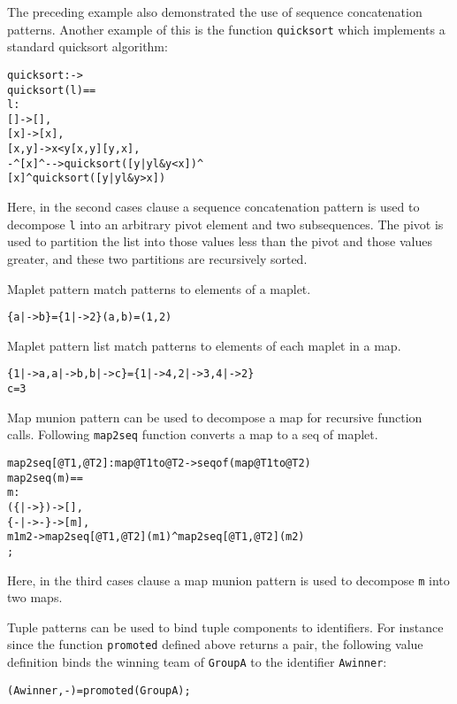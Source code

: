 \documentclass[\pformat,12pt]{article}
\begin{document}
\begin{description}
The preceding example also demonstrated the use of sequence
concatenation patterns. Another example of this is the function
\texttt{quicksort} which implements a standard quicksort algorithm:
\begin{alltt}
  quicksort :  -> 
  quicksort (l) ==
     l:
      [] -> [],
      [x] -> [x],
      [x,y] ->  x < y  [x,y]  [y,x],
      -^[x]^- -> quicksort ([y | y  l & y < x]) ^ 
                 [x] ^ quicksort ([y | y  l & y > x])
\end{alltt}
Here, in the second cases clause a sequence concatenation pattern is
used to decompose \texttt{l} into an arbitrary pivot element and two
subsequences. The pivot is used to partition the list into those
values less than the pivot and those values greater, and these two
partitions are recursively sorted.


Maplet pattern match patterns to elements of a maplet.
\begin{alltt}
 \{a |-> b\} = \{1 |-> 2\}  (a,b) = (1,2)
\end{alltt}

Maplet pattern list match patterns to elements of each maplet in a map.
\begin{alltt}
 \{1 |-> a,a |-> b,b |-> c\} = \{1 |-> 4,2 |-> 3,4 |-> 2\} 
c = 3
\end{alltt}

Map munion pattern can be used to decompose a map for recursive function calls.
Following \texttt{map2seq} function converts a map to a seq of maplet.
\begin{alltt}
map2seq[@T1, @T2] : map @T1 to @T2 -> seq of (map @T1 to @T2)
map2seq(m) ==
   m:
    (\{|->\})	-> [],
    \{- |-> -\}	-> [m],
    m1  m2 -> map2seq[@T1, @T2] (m1) ^  map2seq[@T1, @T2] (m2)
  ;
\end{alltt}
Here, in the third cases clause a map munion pattern is used to decompose \texttt{m} 
into two maps.


Tuple patterns can be used to bind tuple components to
identifiers. For instance since the function \texttt{promoted} defined
above returns a pair, the following value definition binds the winning
team of \texttt{GroupA} to the identifier \texttt{Awinner}:
\begin{alltt}

    (Awinner,-) = promoted(GroupA);
\end{alltt}


\end{description}
\end{document}
